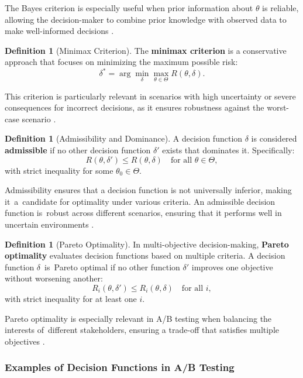 \documentclass[magisterska, english]{pwr_wmat_praca_dyplomowa}
\theoremstyle{plain}
\numberwithin{theorem}{chapter}
\theoremstyle{definition}
\numberwithin{theorem}{chapter}
\newtheorem{definition}[theorem]{Definition}
\begin{document}
The Bayes criterion is especially useful when prior information about \( \theta \) is reliable, allowing the decision-maker to combine prior knowledge with observed data to make well-informed decisions \cite{Berger1985}.

\begin{definition}[Minimax Criterion]
	The \textbf{minimax criterion} is a conservative approach that focuses on minimizing the maximum possible risk:
	\[
	\delta^* = \arg \min_{\delta} \max_{\theta \in \Theta} R(\theta, \delta).
	\]
\end{definition}

This criterion is particularly relevant in scenarios with high uncertainty or severe consequences for incorrect decisions, as it ensures robustness against the worst-case scenario \cite{wald1949statistical}.

\begin{definition}[Admissibility and Dominance]
	A decision function \( \delta \) is considered \textbf{admissible} if no other decision function \( \delta' \) exists that dominates it. Specifically:
	\[
	R(\theta, \delta') \leq R(\theta, \delta) \quad \text{for all } \theta \in \Theta,
	\]
	with strict inequality for some \( \theta_0 \in \Theta \).
\end{definition}

Admissibility ensures that a decision function is not universally inferior, making it~a~candidate for optimality under various criteria. An admissible decision function is~robust across different scenarios, ensuring that it performs well in uncertain environments \cite{lehmann2006theory}.

\begin{definition}[Pareto Optimality]
	In multi-objective decision-making, \textbf{Pareto optimality} evaluates decision functions based on multiple criteria. A decision function \( \delta \)~is~Pareto optimal if no other function \( \delta' \) improves one objective without worsening another:
	\[
	R_i(\theta, \delta') \leq R_i(\theta, \delta) \quad \text{for all } i,
	\]
	with strict inequality for at least one \( i \).
\end{definition}

Pareto optimality is especially relevant in A/B testing when balancing the interests of~different stakeholders, ensuring a trade-off that satisfies multiple objectives \cite{Miettinen1999}.

\subsubsection{Examples of Decision Functions in A/B Testing}
\end{document}
